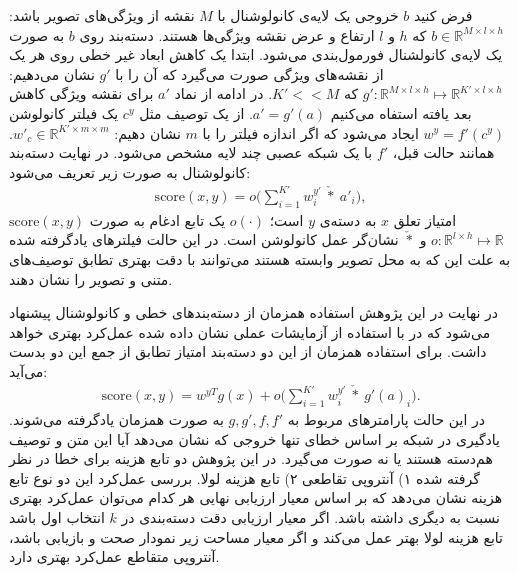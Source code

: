 فرض کنید $b$ خروجی یک لایه‌ی کانولوشنال با $M$ نقشه از ویژگی‌های تصویر باشد: $b \in \mathbb{R}^{M\times l \times h}$ که $h$ و $l$ ارتفاع و عرض نقشه ویژگی‌ها هستند. دسته‌بند روی $b$ به صورت یک لایه‌ی کانولشنال فورمول‌بندی می‌شود. ابتدا یک کاهش ابعاد غیر خطی روی هر یک از نقشه‌های ویژگی صورت می‌گیرد که آن را با $g'$ نشان می‌دهیم:
$g': \mathbb{R}^{M\times l\times h} \mapsto \mathbb{R}^{K'\times l\times h}$
که
$K' << M$.
در ادامه از نماد  $a'$ برای نقشه ویژگی کاهش بعد یافته استفاه می‌کنیم
$a' = g'(a)$.
از یک توصیف مثل $c^y$ یک  فیلتر کانولوشن $w^y = f'(c^y)$ ایجاد می‌شود که اگر اندازه فیلتر را با $m$ نشان دهیم: $w'_c \in \mathbb{R}^{K' \times m \times m}$. همانند حالت قبل، $f'$ با یک شبکه عصبی چند لایه مشخص می‌شود. در نهایت دسته‌بند کانولوشنال به صورت زیر تعریف می‌شود:
\begin{align}
\label{eq:conv}
\text{score}(x,y)=o\bigg(\sum_{i=1}^{K'}w^{y'}_{i}\  \check{*} \  a'_i\bigg),
\end{align}
 $\text{score}(x,y)$
  امتیاز تعلق $x$ به دسته‌ی $y$ است؛ $o(\cdot)$ یک تابع ادغام به صورت $o:\mathbb{R}^{l\times h} \mapsto \mathbb{R}$  و $\check{*}$ نشان‌گر عمل کانولوشن است. در این حالت فیلترهای یادگرفته شده به علت این که به محل تصویر وابسته هستند می‌توانند با دقت بهتری تطابق توصیف‌های متنی و تصویر را نشان دهند.

  در نهایت در این پژوهش استفاده همزمان از دسته‌بندهای خطی و کانولوشنال پیشنهاد می‌شود که در با استفاده از آزمایشات عملی نشان داده شده عمل‌کرد بهتری خواهد داشت. برای استفاده همزمان از این دو دسته‌بند امتیاز تطابق از جمع این دو بدست می‌آید:
\begin{align}
\text{score}(x,y)=w^{yT}g(x) + o\bigg(\sum_{i=1}^{K'}w^{y'}_{i}\  \check{*} \  g'(a)_i\bigg).
\end{align}
در این حالت پارامترهای مربوط به $g, g', f , f'$ به صورت همزمان یادگرفته می‌شوند.
یادگیری در شبکه بر اساس خطای تنها خروجی که نشان می‌دهد آیا این متن و توصیف هم‌دسته هستند یا نه صورت می‌گیرد. در این پژوهش دو تابع هزینه برای خطا در نظر گرفته شده ۱) آنتروپی تقاطعی
۲) تابع هزینه لولا. بررسی عمل‌کرد این دو نوع تابع هزینه نشان می‌دهد که بر اساس معیار ارزیابی نهایی هر کدام می‌توان عمل‌کرد بهتری نسبت به دیگری داشته باشد. اگر معیار ارزیابی دقت دسته‌بندی در $k$ انتخاب اول باشد تابع هزینه لولا بهتر عمل می‌کند و اگر معیار مساحت زیر نمودار صحت و بازیابی باشد، آنتروپی متقاطع عمل‌کرد بهتری دارد.

